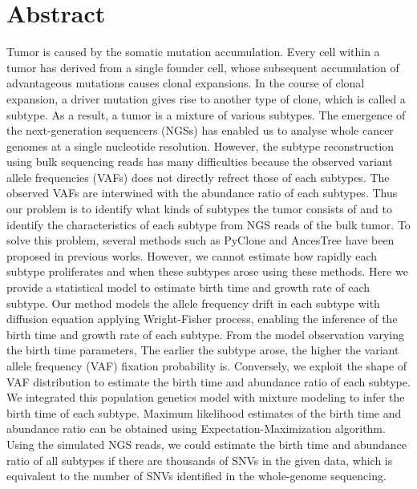 \documentclass{article}
\begin{document}
\section*{Abstract}
Tumor is caused by the somatic mutation accumulation. Every cell within a tumor has derived from a single founder cell, whose subsequent accumulation of advantageous mutations causes clonal expansions. In the course of clonal expansion, a driver mutation gives rise to another type of clone, which is called a subtype. As a result, a tumor is a mixture of various subtypes.
The emergence of the next-generation sequencers (NGSs) has enabled us to analyse whole cancer genomes at a single nucleotide resolution. However, the subtype reconstruction using bulk sequencing reads has many difficulties because the observed variant allele frequencies (VAFs) does not directly refrect those of each subtypes.
The observed VAFs are interwined with the abundance ratio of each subtypes.
 Thus our problem is to identify what kinds of subtypes the tumor consists of and to identify the characteristics of each subtype from NGS reads of the bulk tumor. To solve this problem, several methods such as PyClone and AncesTree have been proposed in previous works. However, we cannot estimate how rapidly each subtype proliferates and when these subtypes arose using these methods. Here we provide a statistical model to estimate birth time and growth rate of each subtype.
 Our method models the allele frequency drift in each subtype with diffusion equation applying Wright-Fisher process, enabling the inference of the birth time and growth rate of each subtype.
 From the model observation varying the birth time parameters, The earlier the subtype arose, the higher the variant allele frequency (VAF) fixation probability is.
 Conversely, we exploit the shape of VAF distribution to estimate the birth time and abundance ratio of each subtype.
 We integrated this population genetics model with mixture modeling to infer the birth time of each subtype. Maximum likelihood estimates of the birth time and abundance ratio can be obtained using Expectation-Maximization algorithm.
Using the simulated NGS reads, we could estimate the birth time and abundance ratio of all subtypes if there are thousands of SNVs in the given data, which is equivalent to the number of SNVs identified in the whole-genome sequencing.
\end{document}
